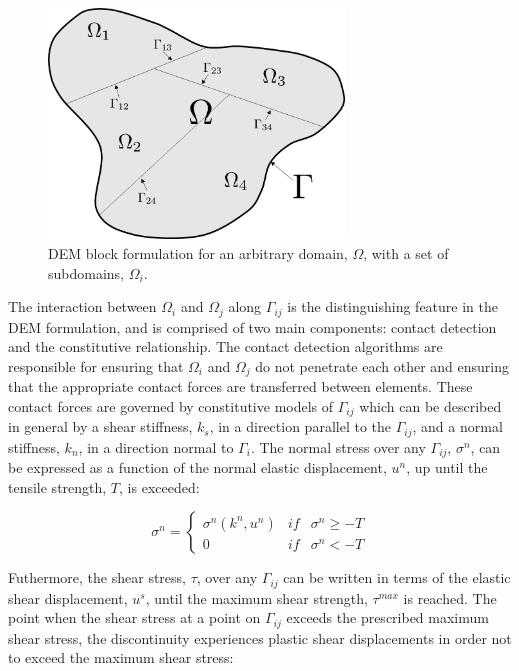 \begin{figure}[!htb]
\begin{center}
\includegraphics[width=0.7\textwidth]{figures/Chapter3/DEMSchematic}
\caption{{\label{fig:DEM}DEM block formulation for an arbitrary domain, $\Omega$, with a set of subdomains, $\Omega_i$.%
}}
\end{center}
\end{figure}

The interaction between $\Omega_i$ and $\Omega_j$ along $\Gamma_{ij}$ is the distinguishing feature in the DEM formulation, and is comprised of two main components: contact detection and the constitutive relationship. The contact detection algorithms are responsible for ensuring that $\Omega_i$ and $\Omega_j$ do not penetrate each other and ensuring that the appropriate contact forces are transferred between elements. These contact forces are governed by constitutive models of $\Gamma_{ij}$ which can be described in general by a shear stiffness, $k_s$, in a direction parallel to the $\Gamma_{ij}$, and a normal stiffness, $k_n$, in a direction normal to $\Gamma_i$. The normal stress over any $\Gamma_{ij}$, $\sigma^n$, can be expressed as a function of the normal elastic displacement, $u^n$, up until the tensile strength, $T$, is exceeded: 

\begin{equation}
\sigma^n=\left\{\begin{matrix}
\sigma^n\left(k^n, u^n\right) &if& \sigma^n \geq -T\\ 
 0 & if &\sigma^n < -T
\end{matrix}\right.
\label{eqn:demnormal}
\end{equation}

Futhermore, the shear stress, $\tau$, over any $\Gamma_{ij}$ can be written in terms of the elastic shear displacement, $u^s$, until the maximum shear strength, $\tau^{max}$ is reached. The point when the shear stress at a point on $\Gamma_{ij}$ exceeds the prescribed maximum shear stress, the discontinuity experiences plastic shear displacements in order not to exceed the maximum shear stress:

